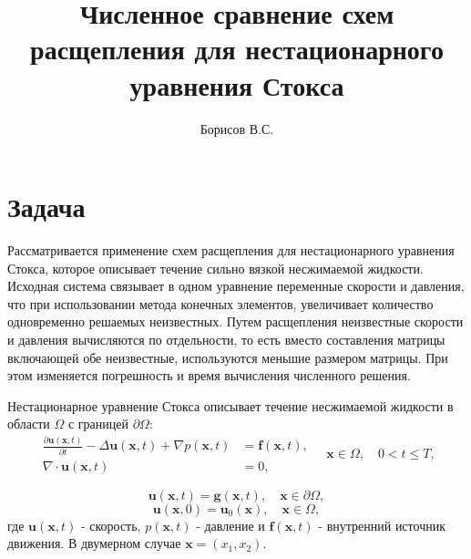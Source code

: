 \documentclass[12pt]{article}
\title{Численное сравнение схем расщепления для нестационарного уравнения Стокса}
\author{Борисов В.С.}
\begin{document}
\maketitle

\section{Задача}
Рассматривается применение схем расщепления для нестационарного уравнения Стокса, которое описывает течение сильно вязкой несжимаемой жидкости. Исходная система связывает в одном уравнение переменные скорости и давления, что при использовании метода конечных элементов, увеличивает количество одновременно решаемых неизвестных. Путем расщепления неизвестные скорости и давления вычисляются по отдельности, то есть вместо составления матрицы включающей обе неизвестные, используются меньшие размером матрицы. При этом изменяется погрешность и время вычисления численного решения.

Нестационарное уравнение Стокса описывает течение несжимаемой жидкости в области $\Omega$ с границей $\partial \Omega$:
\begin{equation}
\begin{split}
\frac{\partial {\bm u}({\bm x}, t)}{\partial t} -\Delta {\bm u}({\bm x}, t) + \nabla p({\bm x}, t) &= {\bm f}({\bm x}, t), \\
\nabla\cdot{\bm u}({\bm x}, t) &= 0, 
\end{split}
\quad {\bm x} \in \Omega, \quad 0<t \leq T,
\end{equation} 

$$
{\bm u(\bm x, t)} = {\bm g}({\bm x}, t), \quad {\bm x} \in \partial \Omega,
$$
$$
{\bm u(\bm x, 0)} = {\bm u_0}({\bm x}), \quad {\bm x} \in \Omega,
$$
где ${\bm u}({\bm x}, t)$ - скорость, $p({\bm x}, t)$ - давление и ${\bm f}({\bm x}, t)$ - внутренний источник движения. В двумерном случае ${\bm x}=(x_1, x_2)$.
\end{document}
